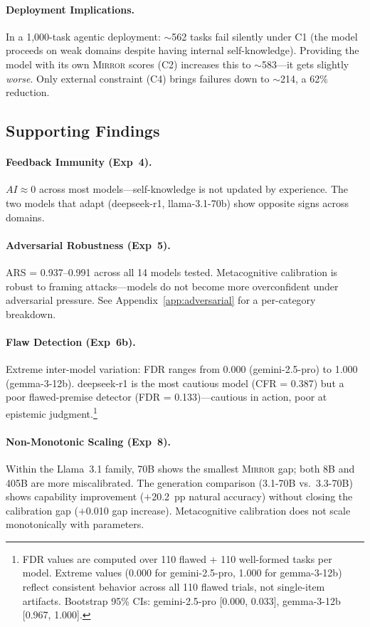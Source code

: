 \documentclass[10pt]{article}
\newcommand{\mirror}{\textsc{Mirror}}
\newcommand{\ARS}{ARS}
\newcommand{\CFR}{CFR}
\newcommand{\FDR}{FDR}
\newcommand{\AI}{AI}
\begin{document}
\paragraph{Deployment Implications.}
In a 1,000-task agentic deployment: ${\sim}$562 tasks fail silently under C1 (the
model proceeds on weak domains despite having internal self-knowledge). Providing
the model with its own \mirror{} scores (C2) increases this to ${\sim}$583---it
gets slightly \textit{worse}. Only external constraint (C4) brings failures down to
${\sim}$214, a 62\% reduction. \subsection{Supporting Findings}

\paragraph{Feedback Immunity (Exp~4).}
$\AI{} \approx 0$ across most models---self-knowledge is not updated by experience. The two models that adapt (deepseek-r1, llama-3.1-70b) show opposite signs across domains.

\paragraph{Adversarial Robustness (Exp~5).}
\ARS{} = 0.937--0.991 across all 14 models tested. Metacognitive calibration is
robust to framing attacks---models do not become more overconfident under
adversarial pressure. See Appendix~\ref{app:adversarial} for a per-category breakdown.

\paragraph{Flaw Detection (Exp~6b).}
Extreme inter-model variation: \FDR{} ranges from 0.000 (gemini-2.5-pro) to 1.000 (gemma-3-12b). deepseek-r1 is the most cautious model (\CFR{} = 0.387) but a poor flawed-premise detector (\FDR{} = 0.133)---cautious in action, poor at epistemic judgment.\footnote{FDR values are computed over 110 flawed + 110 well-formed tasks per model. Extreme values (0.000 for gemini-2.5-pro, 1.000 for gemma-3-12b) reflect consistent behavior across all 110 flawed trials, not single-item artifacts. Bootstrap 95\% CIs: gemini-2.5-pro [0.000, 0.033], gemma-3-12b [0.967, 1.000].}

\paragraph{Non-Monotonic Scaling (Exp~8).}
Within the Llama~3.1 family, 70B shows the smallest \mirror{} gap; both 8B and
405B are more miscalibrated. The generation comparison (3.1-70B vs.\ 3.3-70B)
shows capability improvement ($+$20.2~pp natural accuracy) without closing the
calibration gap ($+$0.010 gap increase). Metacognitive calibration does not scale
monotonically with parameters.
\end{document}

